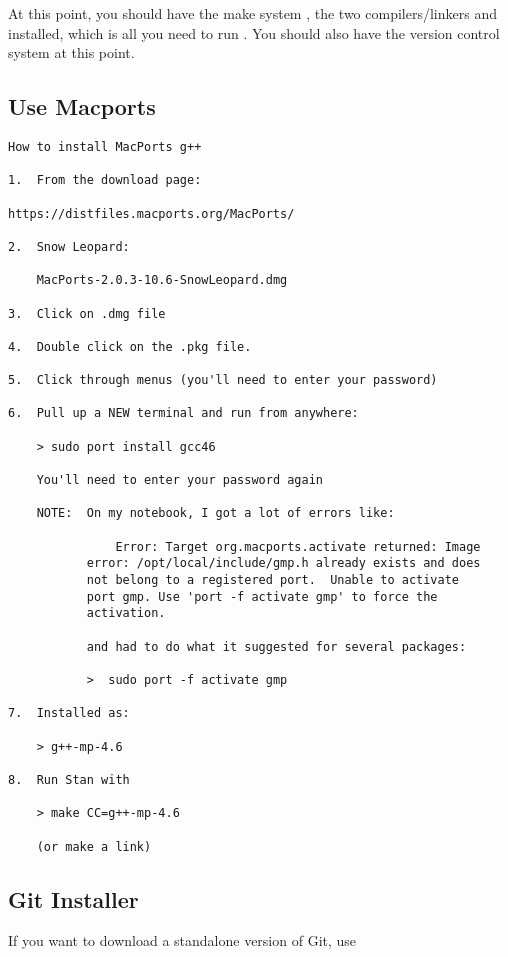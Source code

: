 At this point, you should have the make system , the two
\Cpp compilers/linkers \gpp and \clang installed, which
is all you need to run \Stan.  You should also have the 
version control system at this point.

\subsection{Use Macports}

\begin{Verbatim}
How to install MacPorts g++

1.  From the download page:

https://distfiles.macports.org/MacPorts/

2.  Snow Leopard:

    MacPorts-2.0.3-10.6-SnowLeopard.dmg

3.  Click on .dmg file

4.  Double click on the .pkg file.

5.  Click through menus (you'll need to enter your password)

6.  Pull up a NEW terminal and run from anywhere:

    > sudo port install gcc46

    You'll need to enter your password again

    NOTE:  On my notebook, I got a lot of errors like:

               Error: Target org.macports.activate returned: Image
	       error: /opt/local/include/gmp.h already exists and does
	       not belong to a registered port.  Unable to activate
	       port gmp. Use 'port -f activate gmp' to force the
	       activation.

           and had to do what it suggested for several packages:

           >  sudo port -f activate gmp

7.  Installed as:

    > g++-mp-4.6

8.  Run Stan with

    > make CC=g++-mp-4.6

    (or make a link)
\end{Verbatim}


\subsection{Git Installer}

If you want to download a standalone version of Git, use

